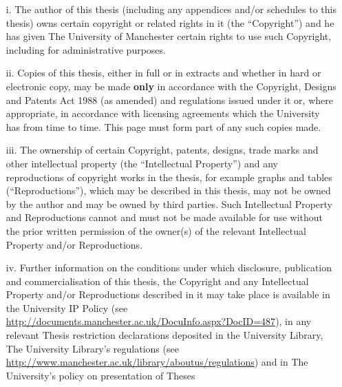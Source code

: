 
{
	
	\begin{enumerate}
		\setlength{\itemsep}{-2pt}%
	
		\item[i.]  The author of this thesis (including any appendices and/or
		schedules to this thesis) owns certain copyright or related rights in it
		(the ``Copyright'') and he has given The University of Manchester certain
		rights to use such Copyright, including for administrative purposes.
		
		\item[ii.] Copies of this thesis, either in full or in extracts and whether
		in hard or electronic copy, may be made \textbf{only} in accordance with
		the Copyright, Designs and Patents Act 1988 (as amended) and regulations
		issued under it or, where appropriate, in accordance with licensing
		agreements which the University has from time to time. This page must form
		part of any such copies made.
		
		\item[iii.] The ownership of certain Copyright, patents, designs, trade
		marks and other intellectual property (the ``Intellectual Property'') and
		any reproductions of copyright works in the thesis, for example graphs and
		tables (``Reproductions''), which may be described in this thesis, may not
		be owned by the author and may be owned by third parties. Such Intellectual
		Property and Reproductions cannot and must not be made available for use
		without the prior written permission of the owner(s) of the relevant
		Intellectual Property and/or Reproductions.
		
		\item[iv.] Further information on the conditions under which disclosure,
		publication and commercialisation of this thesis, the Copyright and any
		Intellectual Property and/or Reproductions described in it may take place
		is available in the University IP Policy (see
		\url{http://documents.manchester.ac.uk/DocuInfo.aspx?DocID=487}), in any
		relevant Thesis restriction declarations deposited in the University
		Library, The University Library's regulations (see
		\url{http://www.manchester.ac.uk/library/aboutus/regulations}) and in The
		University's policy on presentation of Theses
	
	\end{enumerate}
}
